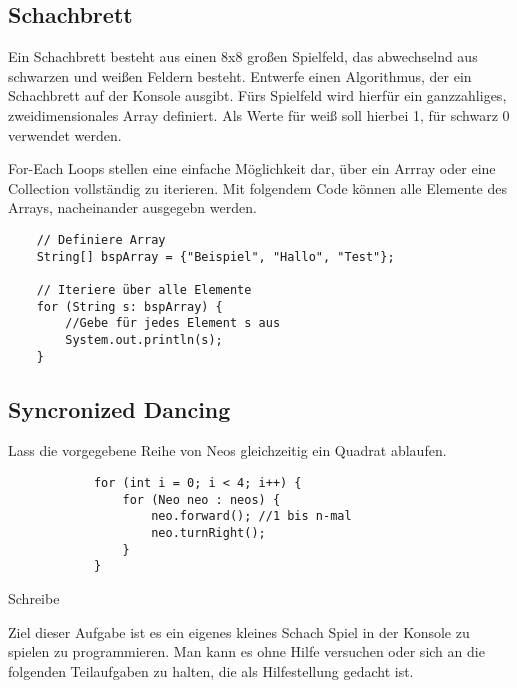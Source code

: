 \begin{questions}
\begin{parts}
        \part{Schachbrett}
        Ein Schachbrett besteht aus einen 8x8 gro{\ss}en Spielfeld, das abwechselnd aus schwarzen und weißen Feldern besteht. Entwerfe einen Algorithmus, der ein Schachbrett auf der Konsole ausgibt. F\"urs Spielfeld wird hierf\"ur ein ganzzahliges, zweidimensionales Array definiert. Als Werte f\"ur wei{\ss} soll hierbei 1, f\"ur schwarz 0 verwendet werden.
    \end{parts}



    For-Each Loops stellen eine einfache Möglichkeit dar, über ein Arrray oder eine Collection vollständig zu iterieren. Mit folgendem Code können alle Elemente des Arrays, nacheinander ausgegebn werden.

    \begin{lstlisting}
    // Definiere Array
    String[] bspArray = {"Beispiel", "Hallo", "Test"};

    // Iteriere über alle Elemente
    for (String s: bspArray) {
        //Gebe für jedes Element s aus
        System.out.println(s);
    }
    \end{lstlisting}

    \begin{parts}
        \part{Syncronized Dancing}
        Lass die vorgegebene Reihe von Neos gleichzeitig ein Quadrat ablaufen.
        \begin{solution}
            \begin{lstlisting}
            for (int i = 0; i < 4; i++) {
                for (Neo neo : neos) {
                    neo.forward(); //1 bis n-mal
                    neo.turnRight();
                }
            }
            \end{lstlisting}
        \end{solution}
    \end{parts}

    Schreibe


    Ziel dieser Aufgabe ist es ein eigenes kleines Schach Spiel in der Konsole zu spielen zu programmieren. Man kann es ohne Hilfe versuchen oder sich an die folgenden Teilaufgaben zu halten, die als Hilfestellung gedacht ist.


\end{questions}

